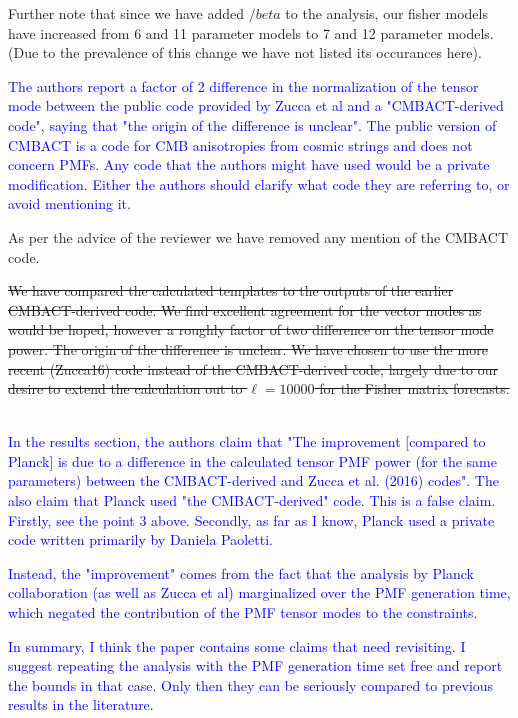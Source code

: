 \documentclass{article}
\newcommand{\removed}[1]{\st{#1}}
\newcommand{\reviewer}[1]{\textcolor{Blue}{#1}}
\newcommand{\diff}[1]{\textcolor{PineGreen}{#1}}
\begin{document}
Further note that since we have added $/beta$ to the analysis, our fisher models have increased from 6 and 11 parameter models to 7 and 12 parameter models. (Due to the prevalence of this change we have not listed its occurances here).


\reviewer{The authors report a factor of 2 difference in the normalization of the tensor mode between the public code provided by Zucca et al and a "CMBACT-derived code", saying that "the origin of the difference is unclear". The public version of CMBACT is a code for CMB anisotropies from cosmic strings and does not concern PMFs. Any code that the authors might have used would be a private modification. Either the authors should clarify what code they are referring to, or avoid mentioning it.}

As per the advice of the reviewer we have removed any mention of the CMBACT code.

\diff{
\removed{
We have compared the calculated templates to the outputs of the earlier CMBACT-derived code.
We find excellent agreement  for the vector modes as would be hoped, however a roughly factor of two difference on the tensor mode power. 
The origin of the difference is unclear.
We have chosen to use the more recent (Zucca16) code instead of the CMBACT-derived code, largely due to our desire to extend the calculation out to $\ell=10000$ for the Fisher matrix forecasts.}}


\diff{}
\\

\reviewer{In the results section, the authors claim that "The improvement [compared to Planck] is due to a difference in the calculated tensor PMF power (for the same
parameters) between the CMBACT-derived and Zucca et al. (2016) codes". The also claim that Planck used "the CMBACT-derived" code. This is a false claim. Firstly, see the point 3 above. Secondly, as far as I know, Planck used a private code written primarily by Daniela Paoletti.}

\reviewer{Instead, the "improvement" comes from the fact that the analysis by Planck collaboration (as well as Zucca et al) marginalized over the PMF generation time, which negated the contribution of the PMF tensor modes to the constraints.}

\reviewer{In summary, I think the paper contains some claims that need revisiting. I suggest repeating the analysis with the PMF generation time set free and report the bounds in that case. Only then they can be seriously compared to previous results in the literature.}
\end{document}
